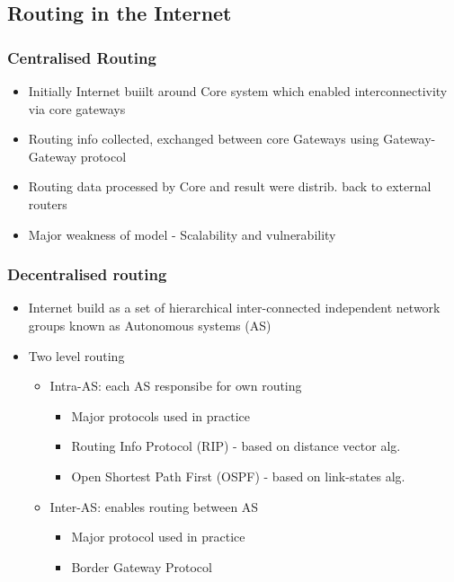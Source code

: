 \subsection{Routing in the Internet}
\subsubsection{Centralised Routing}
\begin{itemize}
	\item Initially Internet buiilt around Core system which enabled
		interconnectivity via core gateways
	\item Routing info collected, exchanged between core Gateways using
		Gateway-Gateway protocol
	\item Routing data processed by Core and result were distrib. back to
		external routers
	\item Major weakness of model - Scalability and vulnerability
\end{itemize}
\subsubsection{Decentralised routing}
\begin{itemize}
	\item Internet build as a set of hierarchical inter-connected
		independent network groups known as Autonomous systems (AS)
	\item Two level routing
	\begin{itemize}
		\item Intra-AS: each AS responsibe for own routing
		\begin{itemize}
			\item Major protocols used in practice
			\item Routing Info Protocol (RIP) - based on distance
				vector alg.
			\item Open Shortest Path First (OSPF) - based on
				link-states alg.
		\end{itemize}
		\item Inter-AS: enables routing between AS
		\begin{itemize}
			\item Major protocol used in practice
			\item Border Gateway Protocol
		\end{itemize}
	\end{itemize}
\end{itemize}
